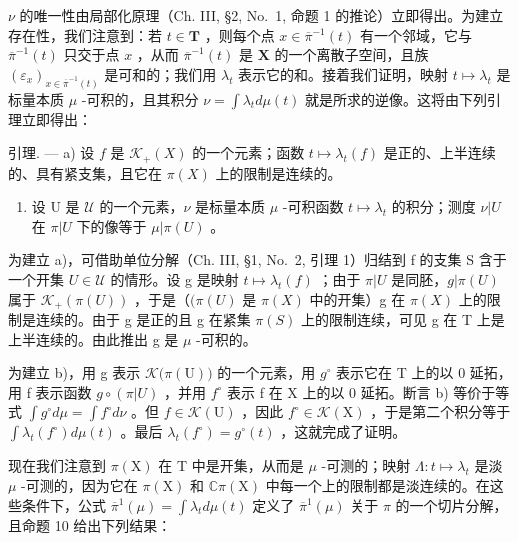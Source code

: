 \(\nu\) 的唯一性由局部化原理（Ch. III, §2, No.~1, 命题 1 的推论）立即得出。为建立存在性，我们注意到：若 \(t \in \mathbf{T}\) ，则每个点 \(x \in \overline{\pi}^{-1}(t)\) 有一个邻域，它与 \(\overline{\pi}^{-1}(t)\) 只交于点 \(x\) ，从而 \(\overline{\pi}^{-1}(t)\) 是 \(\mathbf{X}\) 的一个离散子空间，且族 \((\varepsilon_x)_{x \in \overline{\pi}^{-1}(t)}\) 是可和的；我们用 \(\lambda_t\) 表示它的和。接着我们证明，映射 \(t \mapsto \lambda_t\) 是标量本质 \(\mu\) -可积的，且其积分 \(\nu = \int \lambda_t d\mu(t)\) 就是所求的逆像。这将由下列引理立即得出：

引理. --- a) 设 \(f\) 是 \(\mathcal{K}_{+}(X)\) 的一个元素；函数 \(t \mapsto \lambda_{t}(f)\) 是正的、上半连续的、具有紧支集，且它在 \(\pi(X)\) 上的限制是连续的。

\begin{enumerate}
\def\labelenumi{\alph{enumi})}
\setcounter{enumi}{1}
\tightlist
\item
  设 U 是 \(\mathcal{U}\) 的一个元素，\(\nu\) 是标量本质 \(\mu\) -可积函数 \(t \mapsto \lambda_{t}\) 的积分；测度 \(\nu|U\) 在 \(\pi|U\) 下的像等于 \(\mu|\pi(U)\) 。
\end{enumerate}

为建立 a)，可借助单位分解（Ch. III, §1, No.~2, 引理 1）归结到 f 的支集 S 含于一个开集 \(U \in \mathcal{U}\) 的情形。设 g 是映射 \(t \mapsto \lambda_{t}(f)\) ；由于 \(\pi|U\) 是同胚，\(g|\pi(U)\) 属于 \(\mathcal{K}_{+}(\pi(U))\) ，于是（\((\pi(U)\) 是 \(\pi(X)\) 中的开集）g 在 \(\pi(X)\) 上的限制是连续的。由于 g 是正的且 g 在紧集 \(\pi(S)\) 上的限制连续，可见 g 在 T 上是上半连续的。由此推出 g 是 \(\mu\) -可积的。

为建立 b)，用 g 表示 \(\mathcal{K}\big(\pi(\mathrm{U})\big)\) 的一个元素，用 \(g^{\circ}\) 表示它在 T 上的以 0 延拓，用 f 表示函数 \(g \circ (\pi|U)\) ，并用 \(f^{\circ}\) 表示 f 在 X 上的以 0 延拓。断言 b) 等价于等式 \(\int g^{\circ} d\mu = \int f^{\circ} d\nu\) 。但 \(f \in \mathcal{K}(\mathrm{U})\) ，因此 \(f^{\circ} \in \mathcal{K}(\mathrm{X})\) ，于是第二个积分等于 \(\int \lambda_{t}(f^{\circ}) d\mu(t)\) 。最后 \(\lambda_{t}(f^{\circ}) = g^{\circ}(t)\) ，这就完成了证明。

现在我们注意到 \(\pi(\mathrm{X})\) 在 T 中是开集，从而是 \(\mu\) -可测的；映射 \(\Lambda: t \mapsto \lambda_t\) 是淡 \(\mu\) -可测的，因为它在 \(\pi(\mathrm{X})\) 和 \(\mathbb{C}\pi(\mathrm{X})\) 中每一个上的限制都是淡连续的。在这些条件下，公式 \(\overline{\pi}^{1}(\mu) = \int \lambda_t d\mu(t)\) 定义了 \(\overline{\pi}^{1}(\mu)\) 关于 \(\pi\) 的一个切片分解，且命题 10 给出下列结果：


